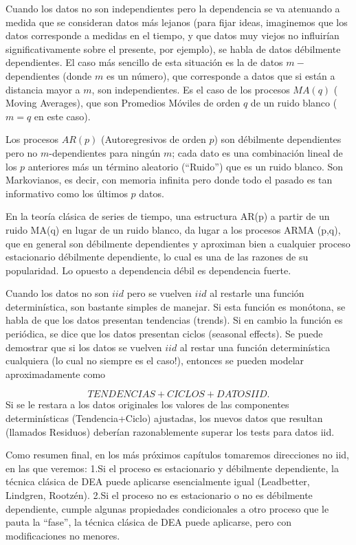 \documentclass[
  12pt]{article}
\begin{document}
Cuando los datos no son independientes pero la dependencia se va
atenuando a medida que se consideran datos más lejanos (para fijar
ideas, imaginemos que los datos corresponde a medidas en el tiempo, y
que datos muy viejos no influirían significativamente sobre el presente,
por ejemplo), se habla de datos débilmente dependientes. El caso más
sencillo de esta situación es la de datos \(m-\)dependientes (donde
\(m\) es un número), que corresponde a datos que si están a distancia
mayor a \(m\), son independientes. Es el caso de los procesos \(MA(q)\)
( Moving Averages), que son Promedios Móviles de orden \(q\) de un ruido
blanco (\(m=q\) en este caso).

Los procesos \(AR(p)\) (Autoregresivos de orden \(p\)) son débilmente
dependientes pero no \(m\)-dependientes para ningún \(m\); cada dato es
una combinación lineal de los \(p\) anteriores más un término aleatorio
(``Ruido'') que es un ruido blanco. Son Markovianos, es decir, con
memoria infinita pero donde todo el pasado es tan informativo como los
últimos \(p\) datos.

En la teoría clásica de series de tiempo, una estructura AR(p) a partir
de un ruido MA(q) en lugar de un ruido blanco, da lugar a los procesos
ARMA (p,q), que en general son débilmente dependientes y aproximan bien
a cualquier proceso estacionario débilmente dependiente, lo cual es una
de las razones de su popularidad. Lo opuesto a dependencia débil es
dependencia fuerte.

Cuando los datos no son \(iid\) pero se vuelven \(iid\) al restarle una
función determinística, son bastante simples de manejar. Si esta función
es monótona, se habla de que los datos presentan tendencias (trends). Si
en cambio la función es periódica, se dice que los datos presentan
ciclos (seasonal effects). Se puede demostrar que si los datos se
vuelven \(iid\) al restar una función determinística cualquiera (lo cual
no siempre es el caso!), entonces se pueden modelar aproximadamente como

\[
TENDENCIAS+CICLOS+ DATOS IID.
\] Si se le restara a los datos originales los valores de las
componentes determinísticas (Tendencia+Ciclo) ajustadas, los nuevos
datos que resultan (llamados Residuos) deberían razonablemente superar
los tests para datos iid.

Como resumen final, en los más próximos capítulos tomaremos direcciones
no iid, en las que veremos: 1.Si el proceso es estacionario y débilmente
dependiente, la técnica clásica de DEA puede aplicarse esencialmente
igual (Leadbetter, Lindgren, Rootzén). 2.Si el proceso no es
estacionario o no es débilmente dependiente, cumple algunas propiedades
condicionales a otro proceso que le pauta la ``fase'', la técnica
clásica de DEA puede aplicarse, pero con modificaciones no menores.
\end{document}
